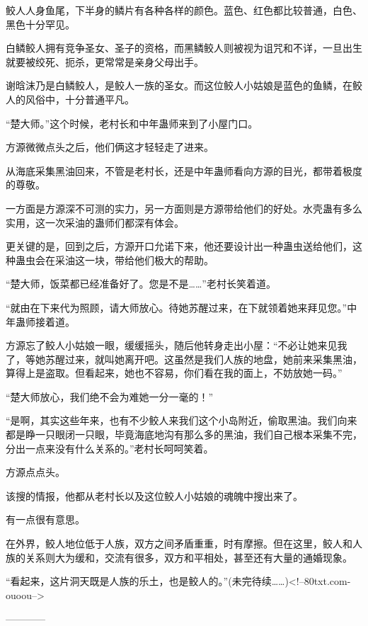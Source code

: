 \begin{this_body}
鲛人人身鱼尾，下半身的鳞片有各种各样的颜色。蓝色、红色都比较普通，白色、黑色十分罕见。

白鳞鲛人拥有竞争圣女、圣子的资格，而黑鳞鲛人则被视为诅咒和不详，一旦出生就要被绞死、扼杀，更常常是亲身父母出手。

谢晗沫乃是白鳞鲛人，是鲛人一族的圣女。而这位鲛人小姑娘是蓝色的鱼鳞，在鲛人的风俗中，十分普通平凡。

“楚大师。”这个时候，老村长和中年蛊师来到了小屋门口。

方源微微点头之后，他们俩这才轻轻走了进来。

从海底采集黑油回来，不管是老村长，还是中年蛊师看向方源的目光，都带着极度的尊敬。

一方面是方源深不可测的实力，另一方面则是方源带给他们的好处。水壳蛊有多么实用，这一次采油的蛊师们都深有体会。

更关键的是，回到之后，方源开口允诺下来，他还要设计出一种蛊虫送给他们，这种蛊虫会在采油这一块，带给他们极大的帮助。

“楚大师，饭菜都已经准备好了。您是不是……”老村长笑着道。

“就由在下来代为照顾，请大师放心。待她苏醒过来，在下就领着她来拜见您。”中年蛊师接着道。

方源忘了鲛人小姑娘一眼，缓缓摇头，随后他转身走出小屋：“不必让她来见我了，等她苏醒过来，就叫她离开吧。这虽然是我们人族的地盘，她前来采集黑油，算得上是盗取。但看起来，她也不容易，你们看在我的面上，不妨放她一码。”

“楚大师放心，我们绝不会为难她一分一毫的！”

“是啊，其实这些年来，也有不少鲛人来我们这个小岛附近，偷取黑油。我们向来都是睁一只眼闭一只眼，毕竟海底地沟有那么多的黑油，我们自己根本采集不完，分出一点来没有什么关系的。”老村长呵呵笑着。

方源点点头。

该搜的情报，他都从老村长以及这位鲛人小姑娘的魂魄中搜出来了。

有一点很有意思。

在外界，鲛人地位低于人族，双方之间矛盾重重，时有摩擦。但在这里，鲛人和人族的关系则大为缓和，交流有很多，双方和平相处，甚至还有大量的通婚现象。

“看起来，这片洞天既是人族的乐土，也是鲛人的。”(未完待续……)<!--80txt.com-ouoou-->

------------

\end{this_body}

